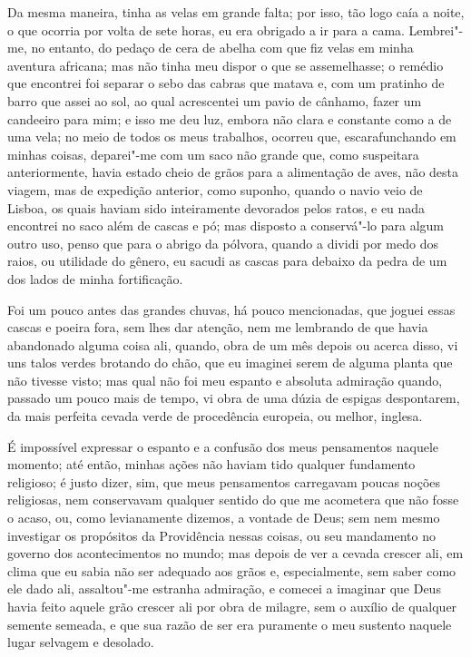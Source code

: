 Da mesma maneira, tinha as velas em grande falta; por isso, tão logo
caía a noite, o que ocorria por volta de sete horas, eu era obrigado a
ir para a cama. Lembrei"-me, no entanto, do pedaço de cera de abelha com
que fiz velas em minha aventura africana; mas não tinha meu dispor o que
se assemelhasse; o remédio que encontrei foi separar o sebo das cabras
que matava e, com um pratinho de barro que assei ao sol, ao qual
acrescentei um pavio de cânhamo, fazer um candeeiro para mim; e isso me
deu luz, embora não clara e constante como a de uma vela; no meio de
todos os meus trabalhos, ocorreu que, escarafunchando em minhas coisas,
deparei"-me com um saco não grande que, como suspeitara anteriormente,
havia estado cheio de grãos para a alimentação de aves, não desta
viagem, mas de expedição anterior, como suponho, quando o navio veio de
Lisboa, os quais haviam sido inteiramente devorados pelos ratos, e eu
nada encontrei no saco além de cascas e pó; mas disposto a conservá"-lo
para algum outro uso, penso que para o abrigo da pólvora, quando a
dividi por medo dos raios, ou utilidade do gênero, eu sacudi as cascas
para debaixo da pedra de um dos lados de minha fortificação.

Foi um pouco antes das grandes chuvas, há pouco mencionadas, que joguei
essas cascas e poeira fora, sem lhes dar atenção, nem me lembrando de
que havia abandonado alguma coisa ali, quando, obra de um mês depois ou
acerca disso, vi uns talos verdes brotando do chão, que eu imaginei
serem de alguma planta que não tivesse visto; mas qual não foi meu
espanto e absoluta admiração quando, passado um pouco mais de tempo, vi
obra de uma dúzia de espigas despontarem, da mais perfeita cevada verde
de procedência europeia, ou melhor, inglesa.

É impossível expressar o espanto e a confusão dos meus pensamentos
naquele momento; até então, minhas ações não haviam tido qualquer
fundamento religioso; é justo dizer, sim, que meus pensamentos
carregavam poucas noções religiosas, nem conservavam qualquer sentido do
que me acometera que não fosse o acaso, ou, como levianamente dizemos, a
vontade de Deus; sem nem mesmo investigar os propósitos da Providência
nessas coisas, ou seu mandamento no governo dos acontecimentos no mundo;
mas depois de ver a cevada crescer ali, em clima que eu sabia não ser
adequado aos grãos e, especialmente, sem saber como ele dado ali,
assaltou"-me estranha admiração, e comecei a imaginar que Deus havia
feito aquele grão crescer ali por obra de milagre, sem o auxílio de
qualquer semente semeada, e que sua razão de ser era puramente o meu
sustento naquele lugar selvagem e desolado.

